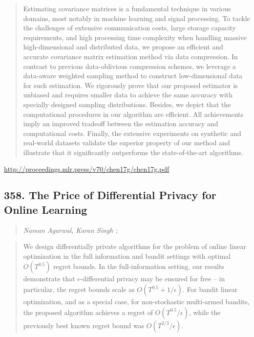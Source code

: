 \documentclass{article}
\begin{document}
\begin{quote}
    Estimating covariance matrices is a fundamental technique in various domains, most notably in machine learning and signal processing. To tackle the challenges of extensive communication costs, large storage capacity requirements, and high processing time complexity when handling massive high-dimensional and distributed data, we propose an efficient and accurate covariance matrix estimation method via data compression. In contrast to previous data-oblivious compression schemes, we leverage a data-aware weighted sampling method to construct low-dimensional data for such estimation. We rigorously prove that our proposed estimator is unbiased and requires smaller data to achieve the same accuracy with specially designed sampling distributions. Besides, we depict that the computational procedures in our algorithm are efficient. All achievements imply an improved tradeoff between the estimation accuracy and computational costs. Finally, the extensive experiments on synthetic and real-world datasets validate the superior property of our method and illustrate that it significantly outperforms the state-of-the-art algorithms.  
\end{quote}

\href{http://proceedings.mlr.press/v70/chen17g/chen17g.pdf}{http://proceedings.mlr.press/v70/chen17g/chen17g.pdf}

\subsection{358. The Price of Differential Privacy for Online Learning}

\begin{quote}
\footnotesize{\textit{Naman Agarwal, Karan Singh ;}}

\end{quote}

\begin{quote}
    We design differentially private algorithms for the problem of online linear optimization in the full information and bandit settings with optimal $O(T^{0.5})$ regret bounds. In the full-information setting, our results demonstrate that $\epsilon$-differential privacy may be ensured for free – in particular, the regret bounds scale as $O(T^{0.5}+1/\epsilon)$. For bandit linear optimization, and as a special case, for non-stochastic multi-armed bandits, the proposed algorithm achieves a regret of $O(T^{0.5}/\epsilon)$, while the previously best known regret bound was $O(T^{2/3}/\epsilon)$.  
\end{quote}
\end{document}
